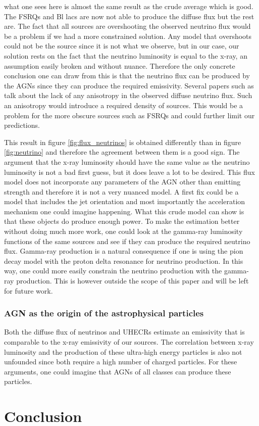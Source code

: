 \documentclass{article}
\begin{document}
what one sees here is almost the same result as the crude average which is good. The FSRQs and Bl lacs are now not able to produce the diffuse flux but the rest are. 
The fact that all sources are overshooting the observed neutrino flux would be a problem if we had a more constrained solution. Any model that overshoots could not be the source since it is not what we observe, but in our case, 
our solution rests on the fact that the neutrino luminosity is equal to the x-ray, an assumption easily broken and without nuance. Therefore the only concrete conclusion one can draw from this is that the neutrino flux can be produced by the AGNs since they can produce the required emissivity.
Several papers such as \cite{Kurahashi_2022} talk about the lack of any anisotropy in the observed diffuse neutrino flux. Such an anisotropy would introduce a required density of sources. This would be a problem for the more obscure sources such as FSRQs and could further limit our predictions.

This result in figure \ref*{fig:flux_neutrinos} is obtained differently than in figure \ref*{fig:neutrino} and therefore the agreement between them is a good sign. The argument that the x-ray luminosity should have the same value as the neutrino luminosity is not a bad first guess, but it does leave a lot to be desired. 
This flux model does not incorporate any parameters of the AGN other than emitting strength and therefore it is not a very nuanced model. A first fix could be a model that includes the jet orientation and most importantly the acceleration mechanism one could imagine happening. What this 
crude model can show is that these objects do produce enough power. To make the estimation better without doing much more work, one could look at the gamma-ray luminosity functions of the same sources and see if they can produce the required neutrino flux. Gamma-ray production is a natural consequence if one is using the pion decay model with the proton delta resonance
for neutrino production. In this way, one could more easily constrain the neutrino production with the gamma-ray production. 
This is however outside the scope of this paper and will be left for future work. 

\subsubsection{AGN as the origin of the astrophysical particles}
Both the diffuse flux of neutrinos and UHECRs estimate an emissivity that is comparable to the x-ray emissivity of our sources. The correlation between x-ray luminosity and the production of these ultra-high energy 
particles is also not unfounded since both require a high number of charged particles. For these arguments, one could imagine that AGNs of all classes can produce these particles. 

\section{Conclusion}



\end{document}

